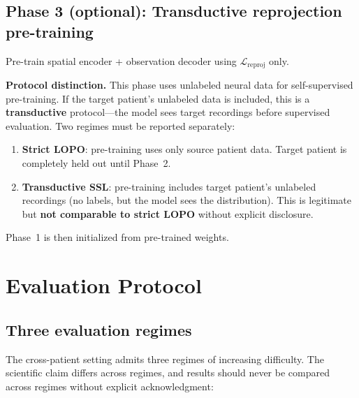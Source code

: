 \documentclass[11pt,letterpaper]{article}
\begin{document}
\subsection{Phase 3 (optional): Transductive reprojection pre-training}\label{sec:phase3}

Pre-train spatial encoder + observation decoder using $\mathcal{L}_{\text{reproj}}$ only.

\textbf{Protocol distinction.} This phase uses unlabeled neural data for self-supervised pre-training. If the target patient's unlabeled data is included, this is a \textbf{transductive} protocol---the model sees target recordings before supervised evaluation. Two regimes must be reported separately:

\begin{enumerate}[leftmargin=2em]
\item \textbf{Strict LOPO}: pre-training uses only source patient data. Target patient is completely held out until Phase~2.
\item \textbf{Transductive SSL}: pre-training includes target patient's unlabeled recordings (no labels, but the model sees the distribution). This is legitimate but \textbf{not comparable to strict LOPO} without explicit disclosure.
\end{enumerate}

Phase~1 is then initialized from pre-trained weights.


\section{Evaluation Protocol}\label{sec:eval-regimes}

\subsection{Three evaluation regimes}

The cross-patient setting admits three regimes of increasing difficulty. The scientific claim differs across regimes, and results should never be compared across regimes without explicit acknowledgment:
\end{document}

